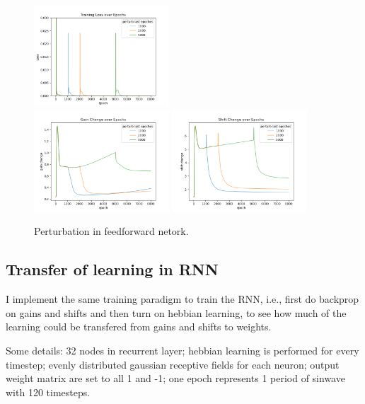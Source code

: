 \documentclass[12pt, a4paper]{article}
\begin{document}
\begin{figure}[H]
    \centering
    \includegraphics[width=0.45\textwidth]{baseline_abb05/fig/0122_abb05_perturb_loss.png} \\
    \includegraphics[width=0.45\textwidth]{baseline_abb05/fig/0122_abb05_perturb_gc.png} 
    \includegraphics[width=0.45\textwidth]{baseline_abb05/fig/0122_abb05_perturb_sc.png}
    \caption{Perturbation in feedforward netork.}
\end{figure}

\newpage

\subsection*{Transfer of learning in RNN}

I implement the same training paradigm to train the RNN, i.e., first do backprop on gains and shifts and then turn on hebbian learning, to see how much of the learning could be transfered from gains and shifts to weights.

Some details: 32 nodes in recurrent layer; hebbian learning is performed for every timestep; evenly distributed gaussian receptive fields for each neuron; output weight matrix are set to all 1 and -1; one epoch represents 1 period of sinwave with 120 timesteps.
\end{document}

